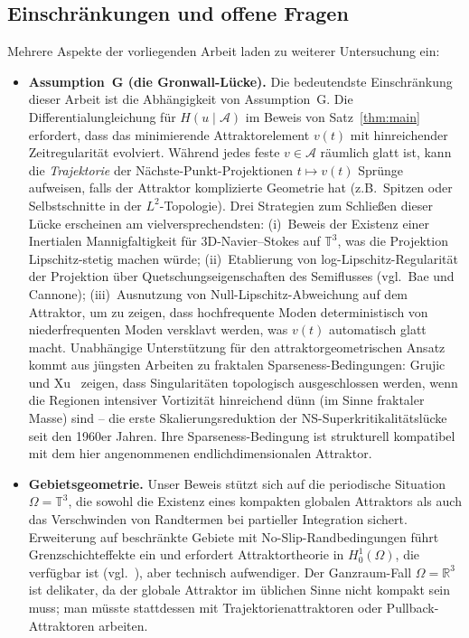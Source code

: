 \documentclass[12pt,a4paper]{article}
\theoremstyle{definition}
\theoremstyle{plain}
\theoremstyle{remark}
\begin{document}
\subsection{Einschränkungen und offene Fragen}

Mehrere Aspekte der vorliegenden Arbeit laden zu weiterer Untersuchung ein:

\begin{itemize}
    \item \textbf{Assumption~G (die Gronwall-Lücke).} Die bedeutendste Einschränkung dieser Arbeit ist die Abhängigkeit von Assumption~G. Die Differentialungleichung für $H(u\mid\mathcal{A})$ im Beweis von Satz~\ref{thm:main} erfordert, dass das minimierende Attraktorelement $v(t)$ mit hinreichender Zeitregularität evolviert. Während jedes feste $v \in \mathcal{A}$ räumlich glatt ist, kann die \emph{Trajektorie} der Nächste-Punkt-Projektionen $t \mapsto v(t)$ Sprünge aufweisen, falls der Attraktor komplizierte Geometrie hat (z.B.\ Spitzen oder Selbstschnitte in der $L^2$-Topologie). Drei Strategien zum Schließen dieser Lücke erscheinen am vielversprechendsten: (i)~Beweis der Existenz einer Inertialen Mannigfaltigkeit für 3D-Navier--Stokes auf $\mathbb{T}^3$, was die Projektion Lipschitz-stetig machen würde; (ii)~Etablierung von log-Lipschitz-Regularität der Projektion über Quetschungseigenschaften des Semiflusses (vgl.\ Bae und Cannone); (iii)~Ausnutzung von Null-Lipschitz-Abweichung auf dem Attraktor, um zu zeigen, dass hochfrequente Moden deterministisch von niederfrequenten Moden versklavt werden, was $v(t)$ automatisch glatt macht.
    Unabhängige Unterstützung für den attraktorgeometrischen Ansatz kommt aus jüngsten Arbeiten zu fraktalen Sparseness-Bedingungen: Grujic und Xu~\cite{GrujicXu2025} zeigen, dass Singularitäten topologisch ausgeschlossen werden, wenn die Regionen intensiver Vortizität hinreichend dünn (im Sinne fraktaler Masse) sind -- die erste Skalierungsreduktion der NS-Superkritikalitätslücke seit den 1960er Jahren. Ihre Sparseness-Bedingung ist strukturell kompatibel mit dem hier angenommenen endlichdimensionalen Attraktor.

    \item \textbf{Gebietsgeometrie.} Unser Beweis stützt sich auf die periodische Situation $\Omega = \mathbb{T}^3$, die sowohl die Existenz eines kompakten globalen Attraktors \cite{FoiasManleyRosaTemam2001} als auch das Verschwinden von Randtermen bei partieller Integration sichert. Erweiterung auf beschränkte Gebiete mit No-Slip-Randbedingungen führt Grenzschichteffekte ein und erfordert Attraktortheorie in $H^1_0(\Omega)$, die verfügbar ist (vgl.\ \cite{Temam2001}), aber technisch aufwendiger. Der Ganzraum-Fall $\Omega = \mathbb{R}^3$ ist delikater, da der globale Attraktor im üblichen Sinne nicht kompakt sein muss; man müsste stattdessen mit Trajektorienattraktoren oder Pullback-Attraktoren arbeiten.


\end{itemize}
\end{document}

